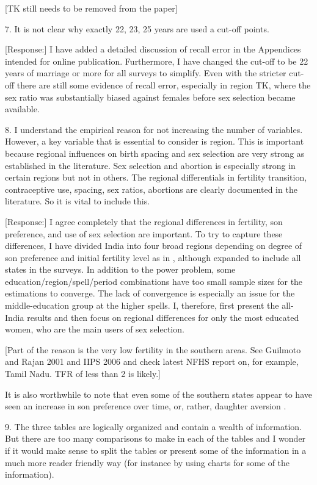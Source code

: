 \documentclass[letterpaper,12pt]{article}
\begin{document}
[TK still needs to be removed from the paper]


7. It is not clear why exactly 22, 23, 25 years are used a cut-off
points.

[Response:]
I have added a detailed discussion of recall error in the Appendices intended for online 
publication.
Furthermore, I have changed the cut-off to be 22 years of marriage or more for all surveys 
to simplify.
Even with the stricter cut-off there are still some evidence of recall error,
especially in region TK, where the sex ratio was substantially biased against females 
before sex selection became available.


8. I understand the empirical reason for not increasing the number of
variables. However, a key variable that is essential to consider is
region. This is important because regional influences on birth spacing
and sex selection are very strong as established in the literature. Sex
selection and abortion is especially strong in certain regions but not
in others. The regional differentials in fertility transition,
contraceptive use, spacing, sex ratios, abortions are clearly documented
in the literature. So it is vital to include this.

[Response:]
I agree completely that the regional differences in fertility, son preference, and use 
of sex selection are important.
To try to capture these differences, I have divided India into four broad regions 
depending on degree of son preference and initial fertility level as in 
\citet{retherford03b}, although expanded to include all states in the surveys.
In addition to the power problem, some education/region/spell/period combinations have too 
small sample sizes for the estimations to converge.
The lack of convergence is especially an issue for the middle-education group at the
higher spells.
I, therefore, first present the all-India results and then focus on regional differences
for only the most educated women, who are the main users of sex selection.

[Part of the reason is the very low fertility in the southern areas. See Guilmoto
and Rajan 2001 and IIPS 2006 and check latest NFHS report on, for example, Tamil Nadu.
TFR of less than 2 is likely.]

It is also worthwhile to note that even some of the southern states appear to have
seen an increase in son preference over time, or, rather, daughter aversion
\citep{DiamondSmith2008}.



9. The three tables are logically organized and contain a wealth of
information. But there are too many comparisons to make in each of the
tables and I wonder if it would make sense to split the tables or
present some of the information in a much more reader friendly way (for
instance by using charts for some of the information). 
\end{document}
